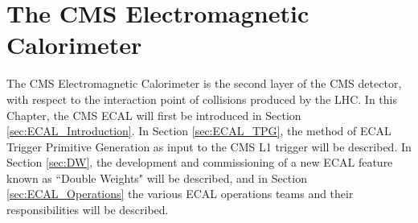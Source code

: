 \chapter{The CMS Electromagnetic Calorimeter}\label{chapter:ECAL}

The CMS Electromagnetic Calorimeter is the second layer of the CMS detector, with respect to the interaction point of collisions produced by the LHC. In this Chapter, the CMS ECAL will first be introduced in Section \ref{sec:ECAL_Introduction}. In Section \ref{sec:ECAL_TPG}, the method of ECAL Trigger Primitive Generation as input to the CMS L1 trigger will be described. In Section \ref{sec:DW}, the development and commissioning of a new ECAL feature known as ``Double Weights" will be described, and in Section \ref{sec:ECAL_Operations} the various ECAL operations teams and their responsibilities will be described.  






